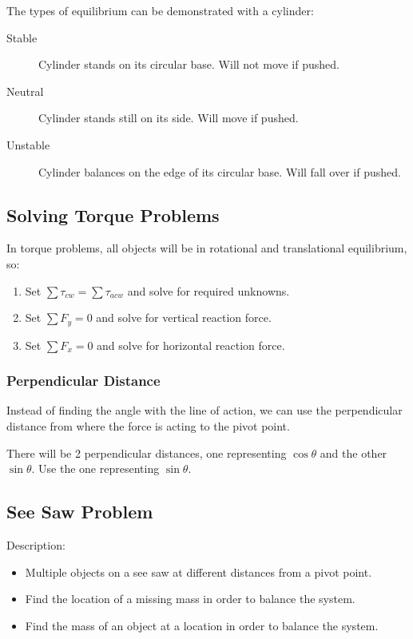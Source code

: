 \documentclass[a4paper,11pt]{report}
\begin{document}
The types of equilibrium can be demonstrated with a cylinder:

\begin{description}
\item [Stable] Cylinder stands on its circular base. Will not move if pushed.
\item [Neutral] Cylinder stands still on its side. Will move if pushed.
\item [Unstable] Cylinder balances on the edge of its circular base. Will fall
	over if pushed.
\end{description}

\subsection{Solving Torque Problems}

In torque problems, all objects will be in rotational and translational
equilibrium, so:

\begin{enumerate}
\item Set $\sum \tau_{cw} = \sum \tau_{acw}$ and solve for required unknowns.
\item Set $\sum F_y = 0$ and solve for vertical reaction force.
\item Set $\sum F_x = 0$ and solve for horizontal reaction force.
\end{enumerate}

\subsubsection{Perpendicular Distance}

Instead of finding the angle with the line of action, we can use the
perpendicular distance from where the force is acting to the pivot point.

There will be 2 perpendicular distances, one representing $\cos{\theta}$ and
the other $\sin{\theta}$.
Use the one representing $\sin{\theta}$.

\subsection{See Saw Problem}

Description:

\begin{itemize}
\item Multiple objects on a see saw at different distances from a pivot point.
\item Find the location of a missing mass in order to balance the system.
\item Find the mass of an object at a location in order to balance the system.
\end{itemize}
\end{document}
